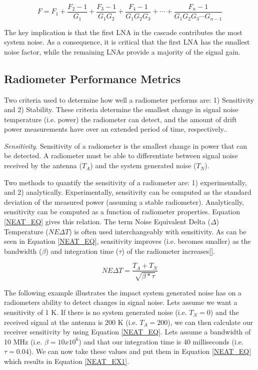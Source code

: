 \begin{equation}\label{noise_factor}
F=F_1+\frac{F_2-1}{G_1}+\frac{F_3-1}{G_1 G_2}+\frac{F_4-1}{G_1 G_2 G_3}+\cdots +\frac{F_n-1}{G_1 G_2 G_3 \cdots G_{n-1}}
\end{equation}

The key implication is that the first LNA in the cascade contributes the most system noise.  As a consequence, it is critical that the first LNA has the smallest noise factor, while the remaining LNAs provide a majority of the signal gain.

\subsection{Radiometer Performance Metrics}\label{performance_metrics}

Two criteria used to determine how well a radiometer performs are: 1) Sensitivity and 2) Stability.  These criteria determine the smallest change in signal noise temperature (i.e. power) the radiometer can detect, and the amount of drift power measurements have over an extended period of time, respectively..

\emph{Sensitivity}.  Sensitivity of a radiometer is the smallest change in power that can be detected.  A radiometer must be able to differentiate between signal noise received by  the antenna ($T_{A}$) and the system generated noise ($T_N$).

Two methods to quantify the sensitivity of a radiometer are: 1) experimentally, and 2) analytically.  Experimentally, sensitivity can be computed as the standard deviation of the measured power (assuming a stable radiometer).  Analytically, sensitivity can be computed as a function of radiometer properties.  Equation \ref{NEAT_EQ} gives this relation.  The term Noise Equivalent Delta ($\Delta$) Temperature ($NE\Delta T$) is often used interchangeably with sensitivity.  As can be seen in Equation \ref{NEAT_EQ}, sensitivity improves (i.e. becomes smaller) as the bandwidth ($\beta$) and integration time ($\tau$) of the radiometer increases[\cite{ulaby}].

\begin{equation} \label{NEAT_EQ}
NE\Delta T=\frac{T_{A}+T_{N}}{\sqrt{\beta * \tau}} 
\end{equation}

The following example illustrates the impact system generated noise has on a radiometers ability to detect changes in signal noise.  Lets assume we want a sensitivity of 1 K.  If there is no system generated noise (i.e. $T_N = 0$) and the received signal at the antenna is 200 K (i.e. $T_A = 200$), we can then calculate our receiver sensitivity by using Equation \ref{NEAT_EQ}.  Lets assume a bandwidth of 10 MHz (i.e. $\beta = 10 x 10^6$) and that our integration time is 40 milliseconds (i.e. $\tau = 0.04$).  We can now take these values and put them in Equation \ref{NEAT_EQ} which results in Equation \ref{NEAT_EX1}.

